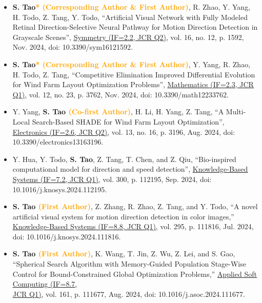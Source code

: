 \documentclass[11pt,a4paper,sans]{moderncv}
\renewcommand{\underline}[1]{\uline{#1}}
\begin{document}
{\begin{itemize}[label=\textbullet]
      \item [19)] \textbf{S. Tao\textcolor{orange}{* (Corresponding Author \& First Author)}}, R. Zhao, Y. Yang, H. Todo, Z. Tang, Y. Todo, “Artificial Visual Network with Fully Modeled Retinal Direction-Selective Neural Pathway for Motion Direction Detection in Grayscale Scenes”, \color{black}\href{https://www.mdpi.com/journal/symmetry}{\underline{Symmetry (IF=2.2, JCR Q2)}}, vol. 16, no. 12, p. 1592, Nov. 2024, doi: 10.3390/sym16121592.
      
      \item [18)] \textbf{S. Tao\textcolor{orange}{* (Corresponding Author \& First Author)}}, Y. Yang, R. Zhao, H. Todo, Z. Tang, “Competitive Elimination Improved Differential Evolution for Wind Farm Layout Optimization Problems”, \color{black}\href{https://www.mdpi.com/journal/mathematics}{\underline{Mathematics (IF=2.3, JCR Q1)}}, vol. 12, no. 23, p. 3762, Nov. 2024, doi: 10.3390/math12233762.
      
      \item [17)] Y. Yang, \textbf{S. Tao \textcolor{orange}{(Co-first Author)}}, H. Li, H. Yang, Z. Tang, “A Multi-Local Search-Based SHADE for Wind Farm Layout Optimization”, \color{black}\href{https://www.mdpi.com/journal/electronics}{\underline{Electronics (IF=2.6, JCR Q2)}}, vol. 13, no. 16, p. 3196, Aug. 2024, doi: 10.3390/electronics13163196.
      
      \item [16)] Y. Hua, Y. Todo, \textbf{S. Tao}, Z. Tang, T. Chen, and Z. Qiu, “Bio-inspired computational model for direction and speed detection”, \color{black}\href{https://www.sciencedirect.com/journal/knowledge-based-systems}{\underline{Knowledge-Based Systems (IF=7.2, JCR Q1)}}, vol. 300, p. 112195, Sep. 2024, doi: 10.1016/j.knosys.2024.112195.
      
      \item [15)] \textbf{S. Tao \textcolor{orange}{(First Author)}}, Z. Zhang, R. Zhao, Z. Tang, and Y. Todo, “A novel artificial visual system for motion direction detection in color images,” \color{black}\href{https://www.sciencedirect.com/journal/knowledge-based-systems}{\underline{Knowledge-Based Systems (IF=8.8, JCR Q1)}}, vol. 295, p. 111816, Jul. 2024, doi: 10.1016/j.knosys.2024.111816.
      
      \item [14)] \textbf{S. Tao \textcolor{orange}{(First Author)}}, K. Wang, T. Jin, Z. Wu, Z. Lei, and S. Gao, “Spherical Search Algorithm with Memory-Guided Population Stage-Wise Control for Bound-Constrained Global Optimization Problems,” \color{black}\href{https://www.sciencedirect.com/journal/applied-soft-computing}{\underline{Applied Soft Computing (IF=8.7}, \\ \underline{JCR Q1)}}, vol. 161, p. 111677, Aug. 2024, doi: 10.1016/j.asoc.2024.111677.


\end{itemize}}
\end{document}
